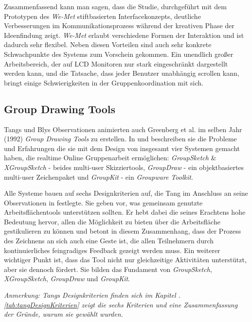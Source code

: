 \medskip Zusammenfassend kann man sagen, dass die Studie, durchgeführt mit dem Prototypen des \emph{We-Met} stiftbasierten Interfacekonzepts, deutliche Verbesserungen im Kommunikationsprozess während der kreativen Phase der Ideenfindung zeigt. \emph{We-Met} erlaubt verschiedene Formen der Interaktion und ist dadurch sehr flexibel. Neben diesen Vorteilen sind auch sehr konkrete Schwachpunkte des Systems zum Vorschein gekommen. Ein unendlich großer Arbeitsbereich, der auf LCD Monitoren nur stark eingeschränkt dargestellt werden kann, und die Tatsache, dass jeder Benutzer unabhängig scrollen kann, bringt einige Schwierigkeiten in der Gruppenkoordination mit sich.

\newpage \subsection{Group Drawing Tools} 
Tangs und Blys Observationen animierten auch Greenberg et al. im selben Jahr (1992) \emph{Group Drawing Tools} zu erstellen. In \citep{Greenberg:1992p207} und \citep{Greenberg:1992p83} beschreiben sie die Probleme und Erfahrungen die sie mit dem Design von insgesamt vier Systemen gemacht haben, die realtime Online Gruppenarbeit ermöglichen: \emph{GroupSketch} \& \emph{XGroupSketch} - beides multi-user Skizziertools, \emph{GroupDraw} - ein objektbasiertes multi-user Zeichenpaket und \emph{GroupKit} - ein \emph{Groupware Toolkit}.

\medskip Alle Systeme bauen auf sechs Designkriterien auf, die Tang im Anschluss an seine Observationen in \citep{TangJC:1989} festlegte. Sie geben vor, was gemeinsam genutzte Arbeitsflächentools unterstützen sollten. Er hebt dabei die seines Erachtens hohe Bedeutung hervor, allen die Möglichkeit zu bieten über die Arbeitsfläche gestikulieren zu können und betont in diesem Zusammenhang, dass der Prozess des Zeichnens an sich auch eine Geste ist, die allen Teilnehmern durch kontinuierliches feingradiges Feedback gezeigt werden muss. Ein weiterer wichtiger Punkt ist, dass das Tool nicht nur gleichzeitige Aktivitäten unterstützt, aber sie dennoch fördert.  Sie bilden das Fundament von \emph{GroupSketch}, \emph{XGroupSketch}, \emph{GroupDraw} und \emph{GroupKit}.

\medskip \emph{Anmerkung: \graffito{\(\clubsuit\)} Tangs Designkriterien finden sich im Kapitel . \autoref{tab:tangDesignKriterien} zeigt die sechs Kriterien und eine Zusammenfassung der Gründe, warum sie gewählt wurden.}

